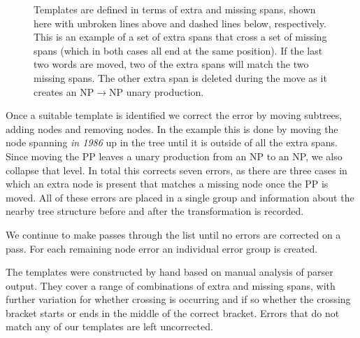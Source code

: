\begin{figure}
\begin{center}
\end{center}
\vspace{-5mm}
\caption{
	\label{fig:template}
	Templates are defined in terms of extra and missing spans, shown here with
	unbroken lines above and dashed lines below, respectively.  This is an
	example of a set of extra spans that cross a set of missing spans (which in
	both cases all end at the same position).  If the last two words are moved,
	two of the extra spans will match the two missing spans.  The other extra
	span is deleted during the move as it creates an NP$\rightarrow$NP unary
	production.
}
\vspace{-3.5mm}
\end{figure}

Once a suitable template is identified we correct the error by moving subtrees,
adding nodes and removing nodes.  In the example this is done by moving the
node spanning \emph{in 1986} up in the tree until it is outside of all the
extra spans.  Since moving the PP leaves a unary production from an NP to an
NP, we also collapse that level.  In total this corrects seven errors, as there
are three cases in which an extra node is present that matches a missing node
once the PP is moved.  All of these errors are placed in a single group and
information about the nearby tree structure before and after the transformation
is recorded.

We continue to make passes through the list until no errors are corrected on a
pass.  For each remaining node error an individual error group is created.

The templates were constructed by hand based on manual analysis of parser
output.  They cover a range of combinations of extra and missing spans, with
further variation for whether crossing is occurring and if so whether the
crossing bracket starts or ends in the middle of the correct bracket.
Errors that do not match any of our templates are left uncorrected.

